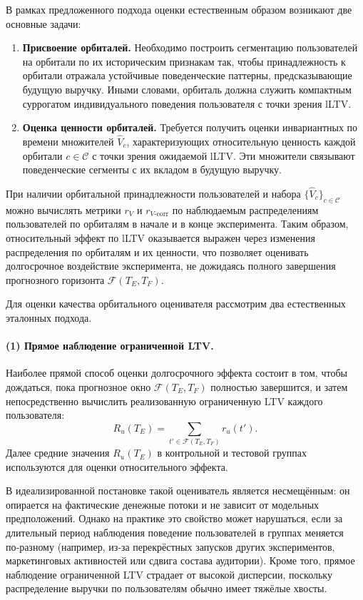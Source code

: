 В рамках предложенного подхода оценки естественным образом
возникают две основные задачи:

\begin{enumerate}
    \item \textbf{Присвоение орбиталей.}
    Необходимо построить сегментацию пользователей на орбитали по их
    историческим признакам так, чтобы принадлежность к орбитали
    отражала устойчивые поведенческие паттерны, предсказывающие
    будущую выручку. Иными словами, орбиталь должна служить
    компактным суррогатом индивидуального поведения пользователя
    с точки зрения lLTV.

    \item \textbf{Оценка ценности орбиталей.}
    Требуется получить оценки инвариантных по времени множителей $\hat{V}_c$, 
    характеризующих относительную ценность каждой орбитали $c \in \mathcal{C}$ с точки
    зрения ожидаемой lLTV. Эти множители связывают
    поведенческие сегменты с их вкладом в будущую выручку.
\end{enumerate}

При наличии орбитальной принадлежности пользователей и набора
$\{\hat{V}_c\}_{c \in \mathcal{C}}$ можно вычислять метрики $r_V$ и
$r_{V\text{-corr}}$ по наблюдаемым распределениям пользователей по
орбиталям в начале и в конце эксперимента. Таким образом, относительный
эффект по lLTV оказывается выражен через изменения
распределения по орбиталям и их ценности, что позволяет оценивать
долгосрочное воздействие эксперимента, не дожидаясь полного завершения
прогнозного горизонта $\mathcal{F}(T_E, T_F)$.

Для оценки качества орбитального оценивателя рассмотрим два
естественных эталонных подхода.


\paragraph{(1) Прямое наблюдение ограниченной LTV.}

Наиболее прямой способ оценки долгосрочного эффекта состоит в том,
чтобы дождаться, пока прогнозное окно $\mathcal{F}(T_E, T_F)$ полностью
завершится, и затем непосредственно вычислить реализованную ограниченную
LTV каждого пользователя:
\[
  R_u(T_E) = \sum_{t' \in \mathcal{F}(T_E, T_F)} r_u(t').
\]
Далее средние значения $R_u(T_E)$ в контрольной и тестовой группах
используются для оценки относительного эффекта.


В идеализированной постановке такой оцениватель является несмещённым:
он опирается на фактические денежные потоки и не зависит от
модельных предположений. Однако на практике это свойство может
нарушаться, если за длительный период наблюдения поведение
пользователей в группах меняется по‑разному (например, из‑за
перекрёстных запусков других экспериментов, маркетинговых активностей
или сдвига состава аудитории). Кроме того, прямое наблюдение
ограниченной LTV страдает от высокой дисперсии, поскольку распределение
выручки по пользователям обычно имеет тяжёлые хвосты.


